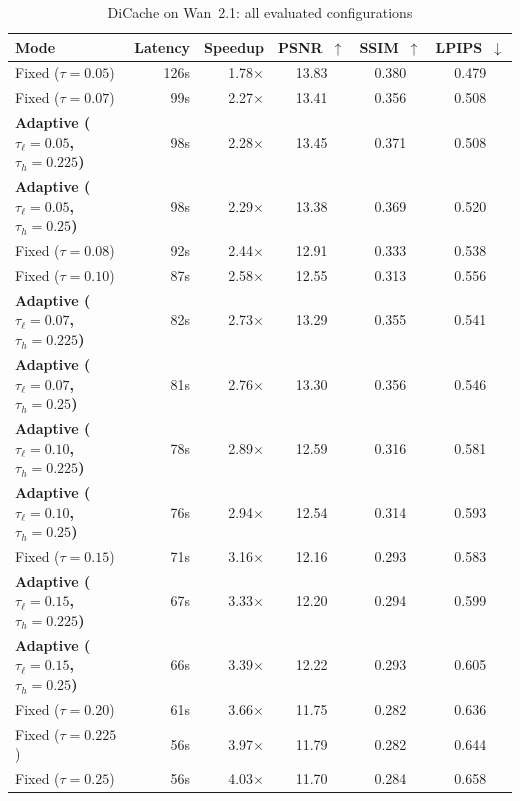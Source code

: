 \documentclass{article}
\begin{document}
\begin{table}[htbp]
\centering
\footnotesize
\setlength{\tabcolsep}{5pt}
\caption{DiCache on Wan~2.1: all evaluated configurations}
\label{tab:app-dc-wan}
\begin{tabular}{lrrccc}
\toprule
\textbf{Mode} & \textbf{Latency} & \textbf{Speedup} & \textbf{PSNR~$\uparrow$} & \textbf{SSIM~$\uparrow$} & \textbf{LPIPS~$\downarrow$} \\
\midrule
  Fixed ($\tau=0.05$) & 126s & 1.78$\times$ & 13.83 & 0.380 & 0.479 \\
  Fixed ($\tau=0.07$) & 99s & 2.27$\times$ & 13.41 & 0.356 & 0.508 \\
  \textbf{Adaptive ($\tau_\ell=0.05$, $\tau_h=0.225$)} & 98s & 2.28$\times$ & 13.45 & 0.371 & 0.508 \\
  \textbf{Adaptive ($\tau_\ell=0.05$, $\tau_h=0.25$)} & 98s & 2.29$\times$ & 13.38 & 0.369 & 0.520 \\
  Fixed ($\tau=0.08$) & 92s & 2.44$\times$ & 12.91 & 0.333 & 0.538 \\
  Fixed ($\tau=0.10$) & 87s & 2.58$\times$ & 12.55 & 0.313 & 0.556 \\
  \textbf{Adaptive ($\tau_\ell=0.07$, $\tau_h=0.225$)} & 82s & 2.73$\times$ & 13.29 & 0.355 & 0.541 \\
  \textbf{Adaptive ($\tau_\ell=0.07$, $\tau_h=0.25$)} & 81s & 2.76$\times$ & 13.30 & 0.356 & 0.546 \\
  \textbf{Adaptive ($\tau_\ell=0.10$, $\tau_h=0.225$)} & 78s & 2.89$\times$ & 12.59 & 0.316 & 0.581 \\
  \textbf{Adaptive ($\tau_\ell=0.10$, $\tau_h=0.25$)} & 76s & 2.94$\times$ & 12.54 & 0.314 & 0.593 \\
  Fixed ($\tau=0.15$) & 71s & 3.16$\times$ & 12.16 & 0.293 & 0.583 \\
  \textbf{Adaptive ($\tau_\ell=0.15$, $\tau_h=0.225$)} & 67s & 3.33$\times$ & 12.20 & 0.294 & 0.599 \\
  \textbf{Adaptive ($\tau_\ell=0.15$, $\tau_h=0.25$)} & 66s & 3.39$\times$ & 12.22 & 0.293 & 0.605 \\
  Fixed ($\tau=0.20$) & 61s & 3.66$\times$ & 11.75 & 0.282 & 0.636 \\
  Fixed ($\tau=0.225$) & 56s & 3.97$\times$ & 11.79 & 0.282 & 0.644 \\
  Fixed ($\tau=0.25$) & 56s & 4.03$\times$ & 11.70 & 0.284 & 0.658 \\
\bottomrule
\end{tabular}
\end{table}
\end{document}
